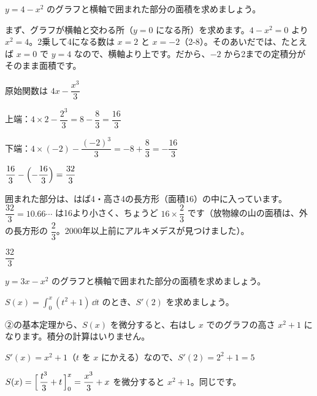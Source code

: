 \begin{reidai}[放物線の下の面積]
$y=4-x^2$ のグラフと横軸で囲まれた部分の面積を求めましょう。\par
\kangaekata まず、グラフが横軸と交わる所（$y=0$ になる所）を求めます。$4-x^2=0$ より $x^2=4$。2乗して4になる数は $x=2$ と $x=-2$（2-8）。そのあいだでは、たとえば $x=0$ で $y=4$ なので、横軸より上です。だから、$-2$ から2までの定積分がそのまま面積です。\par
\begin{center}
\end{center}
\shiki 原始関数は $4x-\dfrac{x^3}{3}$\par
\hspace*{2.6\zw}上端：$4\times2-\dfrac{2^3}{3}=8-\dfrac{8}{3}=\dfrac{16}{3}$\par
\hspace*{2.6\zw}下端：$4\times(-2)-\dfrac{(-2)^3}{3}=-8+\dfrac{8}{3}=-\dfrac{16}{3}$\par
\hspace*{2.6\zw}$\dfrac{16}{3}-\Bigl(-\dfrac{16}{3}\Bigr)=\dfrac{32}{3}$\par
{}囲まれた部分は、はば4・高さ4の長方形（面積16）の中に入っています。$\dfrac{32}{3}=10.66\cdots$ は16より小さく、ちょうど $16\times\dfrac{2}{3}$ です（放物線の山の面積は、外の長方形の $\dfrac{2}{3}$。2000年以上前にアルキメデスが見つけました）。\par
\kotae $\dfrac{32}{3}$
\end{reidai}

\begin{jibun}
$y=3x-x^2$ のグラフと横軸で囲まれた部分の面積を求めましょう。
\end{jibun}

\begin{reidai}[面積の式を微分する]
$S(x)=\displaystyle\int_0^x(t^2+1)\,\dd t$ のとき、$S'(2)$ を求めましょう。\par
\kangaekata ②の基本定理から、$S(x)$ を微分すると、右はし $x$ でのグラフの高さ $x^2+1$ になります。積分の計算はいりません。\par
\shiki $S'(x)=x^2+1$（$t$ を $x$ にかえる）なので、$S'(2)=2^2+1=5$\par
{}$S(x)=\Bigl[\,\dfrac{t^3}{3}+t\,\Bigr]_0^x=\dfrac{x^3}{3}+x$ を微分すると $x^2+1$。同じです。\par
{}
\end{reidai}

